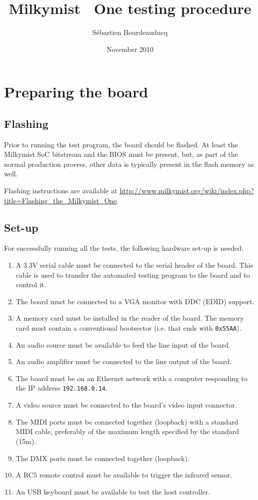\documentclass[a4paper,11pt]{article}
\title{Milkymist\texttrademark~ One testing procedure}
\author{S\'ebastien Bourdeauducq}
\date{November 2010}
\begin{document}
\setlength{\parindent}{0pt}
\setlength{\parskip}{5pt}
\maketitle{}


\section{Preparing the board}
\subsection{Flashing}
Prior to running the test program, the board should be flashed. At least the Milkymist SoC bitstream and the BIOS must be present, but, as part of the normal production process, other data is typically present in the flash memory as well.

Flashing instructions are available at \url{http://www.milkymist.org/wiki/index.php?title=Flashing_the_Milkymist_One}.

\subsection{Set-up}
For successfully running all the tests, the following hardware set-up is needed:
\begin{enumerate}
\item A 3.3V serial cable must be connected to the serial header of the board. This cable is used to transfer the automated testing program to the board and to control it.
\item The board must be connected to a VGA monitor with DDC (EDID) support.
\item A memory card must be installed in the reader of the board. The memory card must contain a conventional bootsector (i.e. that ends with \verb!0x55AA!).
\item An audio source must be available to feed the line input of the board.
\item An audio amplifier must be connected to the line output of the board.
\item The board must be on an Ethernet network with a computer responding to the IP address \verb!192.168.0.14!.
\item A video source must be connected to the board's video input connector.
\item The MIDI ports must be connected together (loopback) with a standard MIDI cable, preferably of the maximum length specified by the standard (15m).
\item The DMX ports must be connected together (loopback).
\item A RC5 remote control must be available to trigger the infrared sensor.
\item An USB keyboard must be available to test the host controller.
\end{enumerate}
\end{document}
